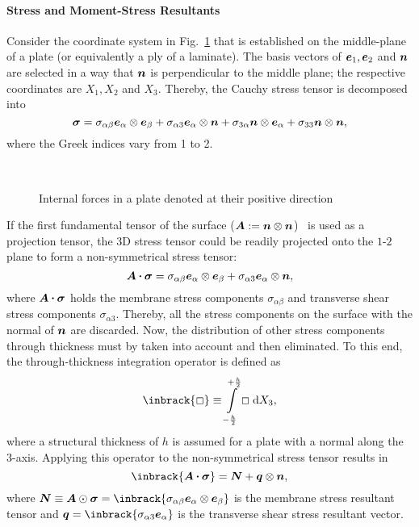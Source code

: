 \paragraph{Stress and Moment-Stress Resultants}	Consider the coordinate system in Fig.~\ref{fig:internal_force} that is established on the middle-plane of a plate (or equivalently a ply of a laminate). The basis vectors of $\base_1,\base_2$ and $\tena{n}$ are selected in a way that $\tena{n}$ is perpendicular to the middle plane; the respective coordinates are $X_1,X_2$ and $X_3$. Thereby, the Cauchy stress tensor is decomposed into	
	\begin{equation}
	\tenb{\sigma}=\sigma_{\alpha\beta}\base_\alpha\dyad\base_\beta+\sigma_{\alpha 3}\base_\alpha\dyad\tena{n}+\sigma_{3 \alpha}\tena{n}\dyad\base_\alpha+\sigma_{33}\tena{n}\dyad\tena{n},
	\end{equation}
	where the Greek indices vary from 1 to 2. 
\begin{figure}[!h]
\centering
{}\\
\caption{Internal forces in a plate denoted at their positive direction}
\label{fig:internal_force}
\end{figure}%
	If the first fundamental tensor of the surface ($\tenb{A}\equidef\tena{n}\dyad\tena{n}$)~\autocite{Eremeyev.2013} is used as a projection tensor, the 3D stress tensor could be readily projected onto the $1$-$2$ plane to form a non-symmetrical stress tensor:
	\begin{equation}
	\tenb{A}\scp\tenb{\sigma}=\sigma_{\alpha\beta}\base_\alpha\dyad\base_\beta+\sigma_{\alpha 3}\base_\alpha\dyad\tena{n},
	\end{equation}
	where $\tenb{A}\scp\tenb{\sigma}$ holds the membrane stress components $\sigma_{\alpha\beta}$ and transverse shear stress components $\sigma_{\alpha 3}$. Thereby, all the stress components on the surface with the normal of $\tena{n}$ are discarded. Now, the distribution of other stress components through thickness must by taken into account and then eliminated. To this end, the through-thickness integration operator is defined as
	\begin{equation}
	\inbrack{\Box}\equiv\thickint{\Box},
	\end{equation}
	where a structural thickness of $h$ is assumed for a plate with a normal along the 3-axis. Applying this operator to the non-symmetrical stress tensor results in
	\begin{equation}
	\inbrack{\tenb{A}\scp\tenb{\sigma}}=\tenb{N}+\tena{q}\dyad\tena{n},
	\end{equation}
	where $\tenb{N}\equiv \tenb{A}\Rayleigh\tenb{\sigma}=\inbrack{\sigma_{\alpha\beta}\base_\alpha\dyad\base_\beta}$ is the membrane stress resultant tensor and $\tena{q}=\inbrack{\sigma_{\alpha 3}\base_\alpha}$ is the transverse shear stress resultant vector. 
	
